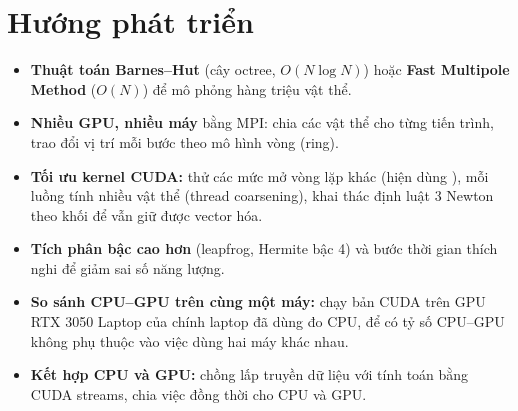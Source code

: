 \section*{Hướng phát triển}

\begin{itemize}
\item \textbf{Thuật toán Barnes--Hut} (cây octree, $O(N\log N)$) hoặc \textbf{Fast Multipole Method} ($O(N)$) để mô phỏng hàng triệu vật thể.
\item \textbf{Nhiều GPU, nhiều máy} bằng MPI: chia các vật thể cho từng tiến trình, trao đổi vị trí mỗi bước theo mô hình vòng (ring).
\item \textbf{Tối ưu kernel CUDA:} thử các mức mở vòng lặp khác (hiện dùng ), mỗi luồng tính nhiều vật thể (thread coarsening), khai thác định luật 3 Newton theo khối để vẫn giữ được vector hóa.
\item \textbf{Tích phân bậc cao hơn} (leapfrog, Hermite bậc 4) và bước thời gian thích nghi để giảm sai số năng lượng.
\item \textbf{So sánh CPU--GPU trên cùng một máy:} chạy bản CUDA trên GPU RTX 3050 Laptop của chính laptop đã dùng đo CPU, để có tỷ số CPU--GPU không phụ thuộc vào việc dùng hai máy khác nhau.
\item \textbf{Kết hợp CPU và GPU:} chồng lấp truyền dữ liệu với tính toán bằng CUDA streams, chia việc đồng thời cho CPU và GPU.
\end{itemize}
